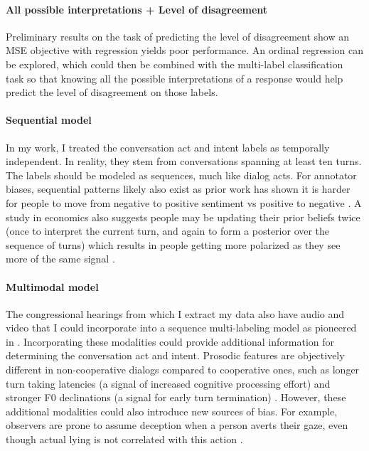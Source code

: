 \paragraph{All possible interpretations + Level of disagreement} Preliminary results on the task of predicting the level of disagreement show an MSE objective with regression yields poor performance. An ordinal regression can be explored, which could then be combined with the multi-label classification task so that knowing all the possible interpretations of a response would help predict the level of disagreement on those labels. 

\paragraph{Sequential model}
In my work, I treated the conversation act and intent labels as temporally independent. In reality, they stem from conversations spanning at least ten turns. The labels should be modeled as sequences, much like dialog acts. For annotator biases, sequential patterns likely also exist as prior work has shown it is harder for people to move from negative to positive sentiment vs positive to negative \cite{Boydstun:2019}. A study in economics also suggests people may be updating their prior beliefs twice (once to interpret the current turn, and again to form a posterior over the sequence of turns) which results in people getting more polarized as they see more of the same signal \cite{Fryer:2019}.


\paragraph{Multimodal model}
The congressional hearings from which I extract my data also have audio and video that I could incorporate into a sequence multi-labeling model as pioneered in \cite{Li:2010}. Incorporating these modalities could provide additional information for determining the conversation act and intent. Prosodic features are objectively different in non-cooperative dialogs compared to cooperative ones, such as longer turn taking latencies (a signal of increased cognitive processing effort) and stronger F0 declinations (a signal for early turn termination) \cite{Reichel:2018}. However, these additional modalities could also introduce new sources of bias. For example, observers are prone to assume deception when a person averts their gaze, even though actual lying is not correlated with this action \cite{Levine:2019}.

